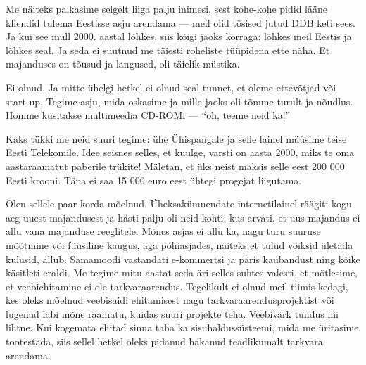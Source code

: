 Me näiteks palkasime selgelt liiga palju inimesi, 
sest kohe-kohe pidid lääne kliendid tulema Eestisse asju arendama --- meil olid 
tõsised jutud DDB keti sees. Ja kui see mull 2000. aastal 
lõhkes, siis 
kõigi jaoks korraga: lõhkes meil Eestis ja lõhkes seal. Ja seda ei suutnud
me täiesti roheliste tüüpidena ette näha. Et majanduses on 
tõusud ja langused, oli täielik müstika. 


Ei olnud. Ja mitte ühelgi hetkel ei olnud seal tunnet, et oleme 
ettevõtjad või start-up. Tegime asju, mida oskasime ja 
mille jaoks oli tõmme turult ja nõudlus. Homme 
küsitakse multimeedia CD-ROMi --- \enquote{oh, teeme neid ka!} 


Kaks tükki me neid suuri tegime: ühe Ühispangale 
ja selle lainel müüsime teise Eesti Telekomile. 
Idee seisnes selles, et kuulge, varsti on aasta 2000, miks te oma 
aastaraamatut paberile trükite! Mäletan, et üks neist 
maksis selle eest 200 000 Eesti krooni. Täna ei saa 15 
000 euro eest ühtegi progejat liigutama.


Olen sellele paar korda mõelnud. Üheksakümnendate internetilainel räägiti kogu aeg uuest majandusest ja hästi palju oli neid kohti, 
kus arvati, et uus majandus ei allu vana majanduse reeglitele. Mõnes asjas ei 
allu ka, nagu turu suuruse mõõtmine või füüsiline kaugus, aga põhiasjades, näiteks et tulud võiksid ületada kulusid, allub. Samamoodi 
vastandati e-kommertsi ja päris kaubandust ning kõike käsitleti 
eraldi. Me tegime mitu aastat seda äri selles suhtes 
valesti, et mõtlesime, et veebiehitamine ei ole tarkvaraarendus. 
Tegelikult ei olnud meil tiimis kedagi, kes oleks mõelnud veebisaidi 
ehitamisest nagu tarkvaraarendusprojektist või lugenud läbi mõne raamatu, kuidas suuri projekte teha. Veebivärk tundus 
nii lihtne. Kui kogemata ehitad sinna taha ka sisuhaldussüsteemi, 
mida me üritasime tootestada, siis sellel hetkel oleks pidanud hakanud teadlikumalt tarkvara arendama. 

